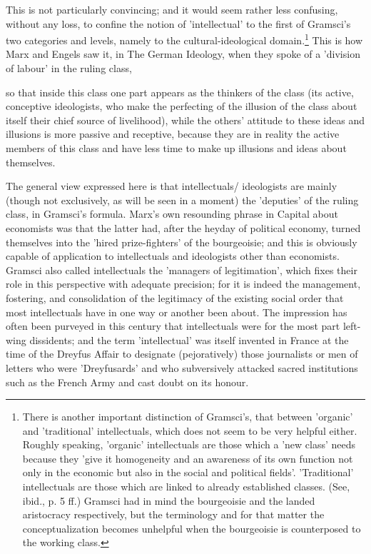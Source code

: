 This is not particularly convincing; and it would seem rather less confusing, without any loss, to confine the notion of 'intellectual' to the first of Gramsci's two categories and levels, namely to the cultural-ideological domain.\footnote{There is another important distinction of Gramsci's, that between 'organic' and 'traditional' intellectuals, which does not seem to be very helpful either. Roughly speaking, 'organic' intellectuals are those which a 'new class' needs because they 'give it homogeneity and an awareness of its own function not only in the economic but also in the social and political fields'. 'Traditional' intellectuals are those which are linked to already established classes. (See, ibid., p. 5 ff.) Gramsci had in mind the bourgeoisie and the landed aristocracy respectively, but the terminology and for that matter the conceptualization becomes unhelpful when the bourgeoisie is counterposed to the working class.} This is how Marx and Engels saw it, in The German Ideology, when they spoke of a 'division of labour' in the ruling class,
\begin{displayquote}
    so that inside this class one part appears as the thinkers of the class (its active, conceptive ideologists, who make the perfecting of the illusion of the class about itself their chief source of livelihood), while the others' attitude to these ideas and illusions is more passive and receptive, because they are in reality the active members of this class and have less time to make up illusions and ideas about themselves.
\end{displayquote}

The general view expressed here is that intellectuals/ ideologists are mainly (though not exclusively, as will be seen in a moment) the 'deputies' of the ruling class, in Gramsci's formula. Marx's own resounding phrase in Capital about economists was that the latter had, after the heyday of political economy, turned themselves into the 'hired prize-fighters' of the bourgeoisie; and this is obviously capable of application to intellectuals and ideologists other than economists. Gramsci also called intellectuals the 'managers of legitimation', which fixes their role in this perspective with adequate precision; for it is indeed the management, fostering, and consolidation of the legitimacy of the existing social order that most intellectuals have in one way or another been about. The impression has often been purveyed in this century that intellectuals were for the most part left-wing dissidents; and the term 'intellectual' was itself invented in France at the time of the Dreyfus Affair to designate (pejoratively) those journalists or men of letters who were 'Dreyfusards' and who subversively attacked sacred institutions such as the French Army and cast doubt on its honour.

